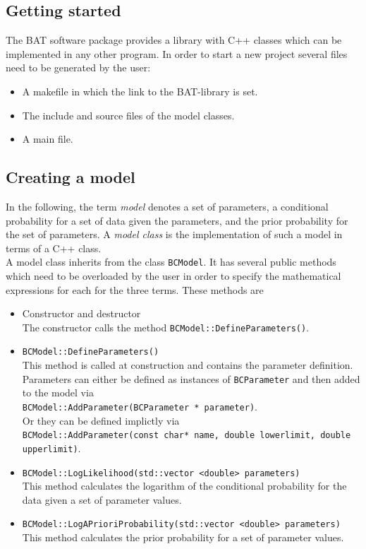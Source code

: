 \documentclass[11pt, a4paper]{article}
\begin{document}

\subsection{Getting started} 

The BAT software package provides a library with C++ classes which can
be implemented in any other program. In order to start a new project
several files need to be generated by the user: 
% 
\begin{itemize}
\item A makefile in which the link to the BAT-library is set. 
\item The include and source files of the model classes. 
\item A main file. 
\end{itemize} 


\subsection{Creating a model} 

In the following, the term {\it model} denotes a set of parameters, a
conditional probability for a set of data given the parameters, and
the prior probability for the set of parameters. A {\it model class}
is the implementation of such a model in terms of a C++ class. \\ 

\noindent 
A model class inherits from the class \verb|BCModel|. It has several
public methods which need to be overloaded by the user in order to
specify the mathematical expressions for each for the three
terms. These methods are
% 
\begin{itemize}
\item Constructor and destructor \\ 
 The constructor calls the method \verb|BCModel::DefineParameters()|.
% 
\item \verb|BCModel::DefineParameters()| \\
 This method is called at construction and contains the parameter
 definition. Parameters can either be defined as instances of
 \verb|BCParameter| and then added to the model via \\
 \verb|BCModel::AddParameter(BCParameter * parameter)|. \\ Or they can
 be defined implictly via \\ 
 \verb|BCModel::AddParameter(const char* name, double lowerlimit, double upperlimit)|.
% 
\item \verb|BCModel::LogLikelihood(std::vector <double> parameters)| \\ 
 This method calculates the logarithm of the conditional probability
 for the data given a set of parameter values. 
%
\item \verb|BCModel::LogAPrioriProbability(std::vector <double> parameters)| \\
 This method calculates the prior probability for a set of parameter
 values. 
\end{itemize} 
\end{document}

